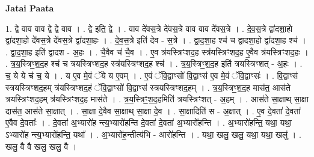 \documentclass[17pt]{extarticle}
\begin{document}
\textbf{Jatai Paata} \newline

1. द्वे वाव वाव द्वे द्वे वाव । . द्वे इति॒ द्वे । . वाव दे॑वस॒त्रे दे॑वस॒त्रे वाव वाव दे॑वस॒त्रे । . दे॒व॒स॒त्रे द्वा॑दशा॒हो द्वा॑दशा॒हो दे॑वस॒त्रे दे॑वस॒त्रे द्वा॑दशा॒हः । . दे॒व॒स॒त्रे इति॑ देव - स॒त्रे । . द्वा॒द॒शा॒ह श्च॑ च द्वादशा॒हो द्वा॑दशा॒ह श्च॑ । . द्वा॒द॒शा॒ह इति॑ द्वादश - अ॒हः । . चै॒वैव च॑ चै॒व । . ए॒व त्र॑यस्त्रिꣳशद॒ह स्त्र॑यस्त्रिꣳशद॒ह ए॒वैव त्र॑यस्त्रिꣳशद॒हः । . त्र॒य॒स्त्रिꣳ॒॒श॒द॒ह श्च॑ च त्रयस्त्रिꣳशद॒ह स्त्र॑यस्त्रिꣳशद॒ह श्च॑ । . त्र॒य॒स्त्रिꣳ॒॒श॒द॒ह इति॑ त्रयस्त्रिꣳशत् - अ॒हः । . च॒ ये ये च॑ च॒ ये । . य ए॒व मे॒वं ॅये य ए॒वम् । . ए॒वं ॅवि॒द्वाꣳसो॑ वि॒द्वाꣳस॑ ए॒व मे॒वं ॅवि॒द्वाꣳसः॑ । . वि॒द्वाꣳस॑ स्त्रयस्त्रिꣳशद॒हम् त्र॑यस्त्रिꣳशद॒हं ॅवि॒द्वाꣳसो॑ वि॒द्वाꣳस॑ स्त्रयस्त्रिꣳशद॒हम् । . त्र॒य॒स्त्रिꣳ॒॒श॒द॒ह मास॑त॒ आस॑ते त्रयस्त्रिꣳशद॒हम् त्र॑यस्त्रिꣳशद॒ह मास॑ते । . त्र॒य॒स्त्रिꣳ॒॒श॒द॒हमिति॑ त्रयस्त्रिꣳशत् - अ॒हम् । . आस॑ते सा॒क्षाथ् सा॒क्षा दास॑त॒ आस॑ते सा॒क्षात् । . सा॒क्षा दे॒वैव सा॒क्षाथ् सा॒क्षा दे॒व । . सा॒क्षादिति॑ स - अ॒क्षात् । . ए॒व दे॒वता॑ दे॒वता॑ ए॒वैव दे॒वताः᳚ । . दे॒वता॑ अ॒भ्यारो॑ह न्त्य॒भ्यारो॑हन्ति दे॒वता॑ दे॒वता॑ अ॒भ्यारो॑हन्ति । . अ॒भ्यारो॑हन्ति॒ यथा॒ यथा॒ ऽभ्यारो॑ह न्त्य॒भ्यारो॑हन्ति॒ यथा᳚ । . अ॒भ्यारो॑ह॒न्तीत्य॑भि - आरो॑हन्ति । . यथा॒ खलु॒ खलु॒ यथा॒ यथा॒ खलु॑ । . खलु॒ वै वै खलु॒ खलु॒ वै । \newline
\end{document}
